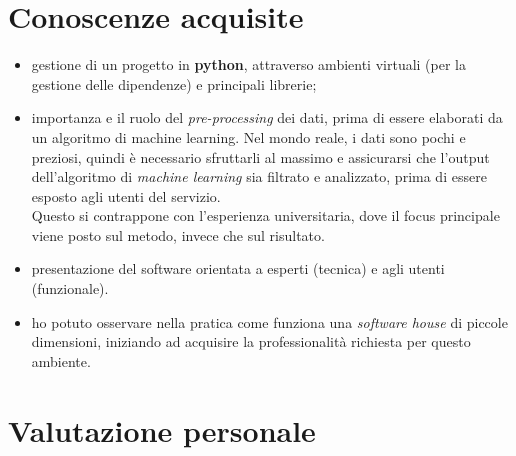 \section{Conoscenze acquisite}
\begin{itemize}%
    \item gestione di un progetto in \textbf{python}, attraverso ambienti virtuali (per la gestione delle dipendenze) e principali librerie;
    \item importanza e il ruolo del \textit{pre-processing} dei dati, prima di essere elaborati da un algoritmo di machine learning. Nel mondo reale, i dati sono pochi e preziosi, quindi è necessario sfruttarli al massimo e assicurarsi che l'output dell'algoritmo di \textit{machine learning} sia filtrato e analizzato, prima di essere esposto agli utenti del servizio.\\ Questo si contrappone con l'esperienza universitaria, dove il focus principale viene posto sul metodo, invece che sul risultato.
    \item presentazione del software orientata a esperti (tecnica) e agli utenti (funzionale).
    \item ho potuto osservare nella pratica come funziona una \textit{software house} di piccole dimensioni, iniziando ad acquisire la professionalità richiesta per questo ambiente.
\end{itemize}
\section{Valutazione personale}
